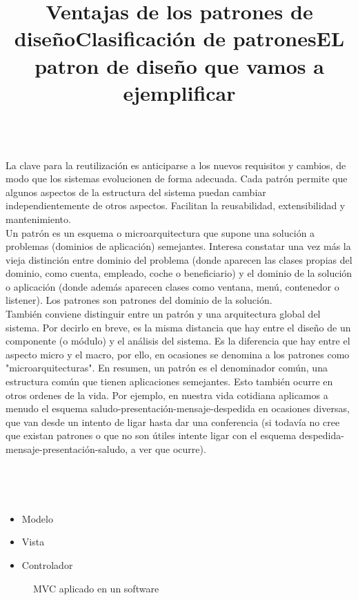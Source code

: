 \documentclass[a4paper,11pt]{report}
\begin{document}
\title{\textbf{Ventajas de los patrones de diseño}}\\

La clave para la reutilización es anticiparse a los nuevos requisitos y cambios, de modo que los sistemas evolucionen de forma adecuada. Cada patrón permite que algunos aspectos de la estructura del sistema puedan cambiar independientemente de otros aspectos. Facilitan la reusabilidad, extensibilidad y mantenimiento.\\
Un patrón es un esquema o microarquitectura que supone una solución a problemas (dominios de aplicación) semejantes. Interesa constatar una vez más la vieja distinción entre dominio del problema (donde aparecen las clases propias del dominio, como cuenta, empleado, coche o beneficiario) y el dominio de la solución o aplicación (donde además aparecen clases como ventana, menú, contenedor o listener). Los patrones son patrones del dominio de la solución.\\
También conviene distinguir entre un patrón y una arquitectura global del sistema. Por decirlo en breve, es la misma distancia que hay entre el diseño de un componente (o módulo) y el análisis del sistema. Es la diferencia que hay entre el aspecto micro y el macro, por ello, en ocasiones se denomina a los patrones como "microarquitecturas".
En resumen, un patrón es el denominador común, una estructura común que tienen aplicaciones semejantes. Esto también ocurre en otros ordenes de la vida. Por ejemplo, en nuestra vida cotidiana aplicamos a menudo el esquema saludo-presentación-mensaje-despedida en ocasiones diversas, que van desde un intento de ligar hasta dar una conferencia (si todavía no cree que existan patrones o que no son útiles intente ligar con el esquema despedida-mensaje-presentación-saludo, a ver que ocurre).

\title{\textbf{Clasificación de patrones}}\\



\title{\textbf{EL patron de diseño que vamos a ejemplificar}}\\






\begin{itemize}
    \item{Modelo}
    \item{Vista}
    \item{Controlador}
\end{itemize}

\begin{figure}[!ht]
\begin{center}

\caption{MVC aplicado en un software}
\end{center}
\end{figure}
\end{document}
